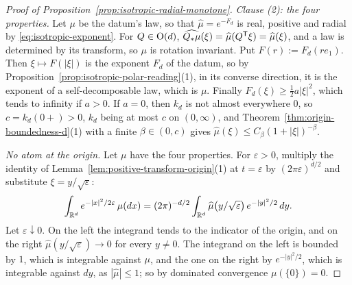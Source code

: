 \begin{proof}[Proof of Proposition~\ref{prop:isotropic-radial-monotone}]
\emph{Clause (2): the four properties.} Let $\mu$ be the datum's law, so that
$\widehat\mu = e^{-F_d}$ is real, positive and radial by \ref{eq:isotropic-exponent}. For
$Q \in \mathrm{O}(d)$, $\widehat{Q_*\mu}(\xi) = \widehat\mu(Q^{\mathsf{T}}\xi) = \widehat\mu(\xi)$, and a law is
determined by its transform, so $\mu$ is rotation invariant. Put $F(r) := F_d(re_1)$. Then
$\xi \mapsto F(|\xi|)$ is the exponent $F_d$ of the datum, so by
Proposition~\ref{prop:isotropic-polar-reading}(1), in its converse direction, it is the exponent of a
self-decomposable law, which is $\mu$. Finally $F_d(\xi) \ge \tfrac12 a|\xi|^2$, which tends to
infinity if $a > 0$. If $a = 0$, then $k_d$ is not almost everywhere $0$, so
$c = k_d(0{+}) > 0$, $k_d$ being at most $c$ on $(0,\infty)$, and
Theorem~\ref{thm:origin-boundedness-d}(1) with a finite $\beta \in (0,c)$ gives
$\widehat\mu(\xi) \le C_\beta(1+|\xi|)^{-\beta}$.

\emph{No atom at the origin.} Let $\mu$ have the four properties. For $\varepsilon > 0$, multiply
the identity of Lemma~\ref{lem:positive-transform-origin}(1) at $t = \varepsilon$ by
$(2\pi\varepsilon)^{d/2}$ and substitute $\xi = y/\sqrt\varepsilon$:
\[
  \int_{\mathbb{R}^d} e^{-|x|^2/2\varepsilon}\,\mu(dx)
   = (2\pi)^{-d/2}\int_{\mathbb{R}^d}\widehat\mu\bigl(y/\sqrt\varepsilon\bigr)\,e^{-|y|^2/2}\,dy .
\]
Let $\varepsilon \downarrow 0$. On the left the integrand tends to the indicator of the origin, and
on the right $\widehat\mu(y/\sqrt\varepsilon) \to 0$ for every $y \ne 0$. The integrand on the left is bounded
by $1$, which is integrable against $\mu$, and the one on the right by $e^{-|y|^2/2}$, which is
integrable against $dy$, as $|\widehat\mu| \le 1$; so by dominated convergence $\mu(\{0\}) = 0$.


\end{proof}
